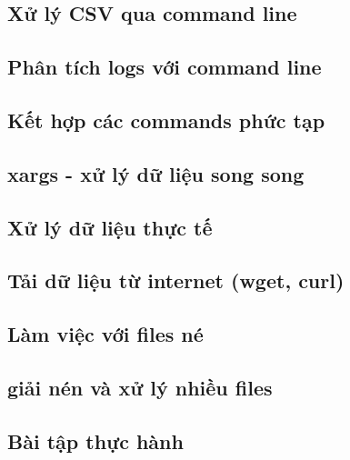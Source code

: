\documentclass[11pt]{article}
\begin{document}
\subsection{Xử lý CSV qua command line}


\subsection{Phân tích logs với command line}


\subsection{Kết hợp các commands phức tạp}


\subsection{xargs - xử lý dữ liệu song song}

\subsection{Xử lý dữ liệu thực tế}

\subsection{Tải dữ liệu từ internet (wget, curl)}

\subsection{Làm việc với files né}

\subsection{giải nén và xử lý nhiều files}

\subsection{Bài tập thực hành}
\end{document}
